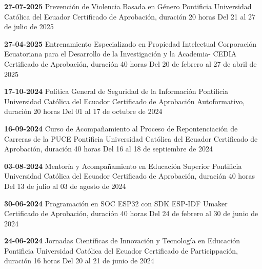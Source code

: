 \begin{levent}
    \cvevent
	{\textbf{27-07-2025}}
	{Prevención de Violencia Basada en Género}
	{Pontificia Universidad Católica del Ecuador}
	{Certificado de Aprobación, duración 20 horas}
	{Del 21 al 27 de julio de 2025}
\end{levent}

\begin{levent}
    \cvevent
	{\textbf{27-04-2025}}
	{Entrenamiento Especializado en Propiedad Intelectual}
	{Corporación Ecuatoriana para el Desarrollo de la Investigación y la Academia- CEDIA}
	{Certificado de Aprobación, duración 40 horas}
	{Del 20 de febrero al 27 de abril de 2025}
\end{levent}


\begin{levent}
    \cvevent
	{\textbf{17-10-2024}}
	{Política General de Seguridad de la Información}
	{Pontificia Universidad Católica del Ecuador}
	{Certificado de Aprobación Autoformativo, duración 20 horas}
	{Del 01 al 17 de octubre de 2024}
\end{levent}



\begin{levent}
    \cvevent
	{\textbf{16-09-2024}}
	{Curso de Acompañamiento al Proceso de Repontenciación de Carreras de la PUCE}
	{Pontificia Universidad Católica del Ecuador}
	{Certificado de Aprobación, duración 40 horas}
	{Del 16 al 18 de septiembre de 2024}
\end{levent}

\begin{levent}
    \cvevent
	{\textbf{03-08-2024}}
	{Mentoría y Acompañamiento en Educación Superior}
	{Pontificia Universidad Católica del Ecuador}
	{Certificado de Aprobación, duración 40 horas}
	{Del 13 de julio al 03 de agosto de 2024}
\end{levent}


\begin{devent}
    \cvevent
	{\textbf{30-06-2024}}
	{Programación en SOC ESP32 con SDK ESP-IDF}
	{Umaker}
	{Certificado de Aprobación, duración 40 horas}
	{Del 24 de febrero al 30 de junio de 2024}
\end{devent}


\begin{devent}
    \cvevent
	{\textbf{24-06-2024}}
	{Jornadas Científicas de Innovación y Tecnología en Educación}
	{Pontificia Universidad Católica del Ecuador}
	{Certificado de Particippación, duración 16 horas}
	{Del 20 al 21 de junio de 2024}
\end{devent}


